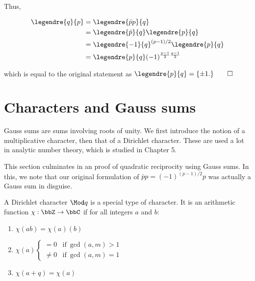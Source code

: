 \documentclass[a4paper, 12pt,oneside,openany]{book}
\begin{document}
Thus, 

\begin{align*}
	\legendre{q}{p} &= \legendre{\bar{p}p}{q}\\ &= \legendre{\bar{p}}{q} \legendre{p}{q} \\
	&=\legendre{-1}{q}^{(p-1)/2} \legendre{p}{q}\\
	&=  \legendre{p}{q} (-1)^{\frac{p-1}{2}\frac{q-1}{2}}
\end{align*} 

which is equal to the original statement as $\legendre{p}{q} = \{\pm 1.\} \qed$

\section{Characters and Gauss sums}

Gauss sums are sums involving roots of unity. We first introduce the notion of a multiplicative character, then that of a Dirichlet character. These are used a lot in analytic number theory, which is studied in Chapter 5. 

This section culminates in an proof of quadratic reciprocity using Gauss sums. In this, we note that our original formulation of $\bar{p}p=(-1)^{(p-1)/2}p$ was actually a Gauss sum in disguise.



A Dirichlet character $\Mod q$ is a special type of character. It is an arithmetic function $\chi:\bbZ\to\bbC$ if for all integers $a$ and $b$:

\begin{enumerate}
	\item $\chi(ab)=\chi(a)(b)$
	\item $\chi(a) \begin{cases} =0 & \text{if}\ \gcd(a, m)>1 \\ \neq 0 & \text{if}\ \gcd(a, m) =1 \end{cases}$
	\item $\chi(a+q)=\chi(a)$
\end{enumerate}
\end{document}
